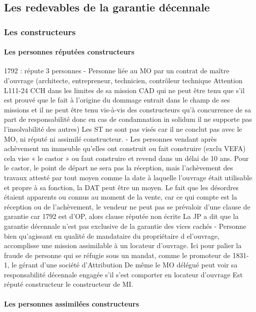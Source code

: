 	\subsection{Les redevables de la garantie décennale}

		\subsubsection{Les constructeurs}

			\paragraph{Les personnes réputées constructeurs}

			1792 : répute 3 personnes
			-	Personne liée au MO par un contrat de maître d’ouvrage (architecte, entrepreneur, technicien, contrôleur technique Attention L111-24 CCH dans les limites de sa mission CAD qui ne peut être tenu que s’il est prouvé que le fait à l’origine du dommage entrait dans le champ de ses missions et il ne peut être tenu vis-à-vis des constructeurs qu’à concurrence de sa part de responsabilité donc en cas de condamnation in solidum il ne supporte pas l’insolvabilité des autres)
			Les ST ne sont pas visés car il ne conclut pas avec le MO, ni réputé ni assimilé constructeur.
			-	Les personnes vendant après achèvement un immeuble qu’elles ont construit ou fait construire (exclu VEFA) cela vise « le castor » ou faut construire et revend dans un délai de 10 ans.
			Pour le castor, le point de départ ne sera pas la réception, mais l’achèvement des travaux attesté par tout moyen comme la date à laquelle l’ouvrage était utilisable et propre à sa fonction, la DAT peut être un moyen.
			Le fait que les désordres étaient apparents ou connus au moment de la vente, car ce qui compte est la réception ou de l’achèvement, le vendeur ne peut pas se prévaloir d’une clause de garantie car 1792 est d’OP, alors clause réputée non écrite
			La JP a dit que la garantie décennale n’est pas exclusive de la garantie des vices cachés
			-	Personne bien qu’agissant en qualité de mandataire du propriétaire d el’ouvrage, accomplisse une mission assimilable à un locateur d’ouvrage. Ici pour palier la fraude de personne qui se réfugie sous un mandat, comme le promoteur de 1831-1, le gérant d’une société d’Attribution
			De même le MO délégué peut voir sa responsabilité décennale engagée s’il s’est comporter en locateur d’ouvrage
			Est réputé constructeur le constructeur de MI.


			\paragraph{Les personnes assimilées constructeurs}


